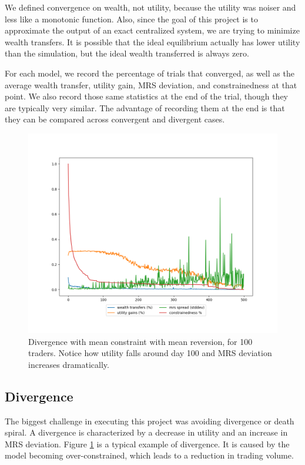 \documentclass[12pt,a4paper,titlepage]{article}
\begin{document}
We defined convergence on wealth, not utility, because the utility was noiser and less like a monotonic function.
Also, since the goal of this project is to approximate the output of an exact centralized system, we are trying to minimize wealth transfers.
It is possible that the ideal equilibrium actually has lower utility than the simulation, but the ideal wealth transferred is always zero.

For each model, we record the percentage of trials that converged, as well as the average wealth transfer, utility gain, MRS deviation, and constrainedness at that point.
We also record those same statistics at the end of the trial, though they are typically very similar.
The advantage of recording them at the end is that they can be compared across convergent and divergent cases.

\begin{figure}[H]
    \centering
    \includegraphics[width=\textwidth]{seed_0.png}
    \caption{
      Divergence with mean constraint with mean reversion, for 100 traders.
      Notice how utility falls around day 100 and MRS deviation increases dramatically.
    }
    \label{fig:div}
\end{figure}

\subsection{Divergence}
The biggest challenge in executing this project was avoiding divergence or death spiral.
A divergence is characterized by a decrease in utility and an increase in MRS deviation.
Figure \ref{fig:div} is a typical example of divergence. 
It is caused by the model becoming over-constrained, which leads to a reduction in trading volume.
\end{document}
